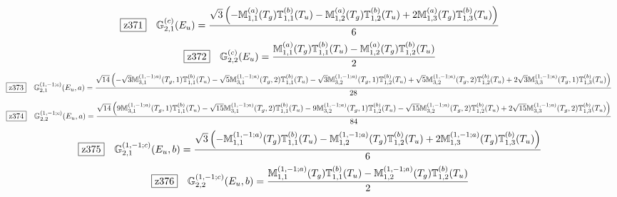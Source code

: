 \documentclass[fleqn,10pt,landscape]{jsarticle}
\begin{document}
\begin{dmath*}
\hspace*{3mm}\fbox{z371}\quad \mathbb{G}_{2,1}^{(c)}(E_{u})=\frac{\sqrt{3} \left(- \mathbb{M}_{1,1}^{(a)}(T_{g}) \mathbb{T}_{1,1}^{(b)}(T_{u}) - \mathbb{M}_{1,2}^{(a)}(T_{g}) \mathbb{T}_{1,2}^{(b)}(T_{u}) + 2 \mathbb{M}_{1,3}^{(a)}(T_{g}) \mathbb{T}_{1,3}^{(b)}(T_{u})\right)}{6}
\end{dmath*}
\begin{dmath*}
\hspace*{3mm}\fbox{z372}\quad \mathbb{G}_{2,2}^{(c)}(E_{u})=\frac{\mathbb{M}_{1,1}^{(a)}(T_{g}) \mathbb{T}_{1,1}^{(b)}(T_{u}) - \mathbb{M}_{1,2}^{(a)}(T_{g}) \mathbb{T}_{1,2}^{(b)}(T_{u})}{2}
\end{dmath*}
\begin{dmath*}
\hspace*{3mm}\fbox{z373}\quad \mathbb{G}_{2,1}^{(1,-1;c)}(E_{u},a)=\frac{\sqrt{14} \left(- \sqrt{3} \mathbb{M}_{3,1}^{(1,-1;a)}(T_{g},1) \mathbb{T}_{1,1}^{(b)}(T_{u}) - \sqrt{5} \mathbb{M}_{3,1}^{(1,-1;a)}(T_{g},2) \mathbb{T}_{1,1}^{(b)}(T_{u}) - \sqrt{3} \mathbb{M}_{3,2}^{(1,-1;a)}(T_{g},1) \mathbb{T}_{1,2}^{(b)}(T_{u}) + \sqrt{5} \mathbb{M}_{3,2}^{(1,-1;a)}(T_{g},2) \mathbb{T}_{1,2}^{(b)}(T_{u}) + 2 \sqrt{3} \mathbb{M}_{3,3}^{(1,-1;a)}(T_{g},1) \mathbb{T}_{1,3}^{(b)}(T_{u})\right)}{28}
\end{dmath*}
\begin{dmath*}
\hspace*{3mm}\fbox{z374}\quad \mathbb{G}_{2,2}^{(1,-1;c)}(E_{u},a)=\frac{\sqrt{14} \left(9 \mathbb{M}_{3,1}^{(1,-1;a)}(T_{g},1) \mathbb{T}_{1,1}^{(b)}(T_{u}) - \sqrt{15} \mathbb{M}_{3,1}^{(1,-1;a)}(T_{g},2) \mathbb{T}_{1,1}^{(b)}(T_{u}) - 9 \mathbb{M}_{3,2}^{(1,-1;a)}(T_{g},1) \mathbb{T}_{1,2}^{(b)}(T_{u}) - \sqrt{15} \mathbb{M}_{3,2}^{(1,-1;a)}(T_{g},2) \mathbb{T}_{1,2}^{(b)}(T_{u}) + 2 \sqrt{15} \mathbb{M}_{3,3}^{(1,-1;a)}(T_{g},2) \mathbb{T}_{1,3}^{(b)}(T_{u})\right)}{84}
\end{dmath*}
\begin{dmath*}
\hspace*{3mm}\fbox{z375}\quad \mathbb{G}_{2,1}^{(1,-1;c)}(E_{u},b)=\frac{\sqrt{3} \left(- \mathbb{M}_{1,1}^{(1,-1;a)}(T_{g}) \mathbb{T}_{1,1}^{(b)}(T_{u}) - \mathbb{M}_{1,2}^{(1,-1;a)}(T_{g}) \mathbb{T}_{1,2}^{(b)}(T_{u}) + 2 \mathbb{M}_{1,3}^{(1,-1;a)}(T_{g}) \mathbb{T}_{1,3}^{(b)}(T_{u})\right)}{6}
\end{dmath*}
\begin{dmath*}
\hspace*{3mm}\fbox{z376}\quad \mathbb{G}_{2,2}^{(1,-1;c)}(E_{u},b)=\frac{\mathbb{M}_{1,1}^{(1,-1;a)}(T_{g}) \mathbb{T}_{1,1}^{(b)}(T_{u}) - \mathbb{M}_{1,2}^{(1,-1;a)}(T_{g}) \mathbb{T}_{1,2}^{(b)}(T_{u})}{2}
\end{dmath*}
\end{document}
